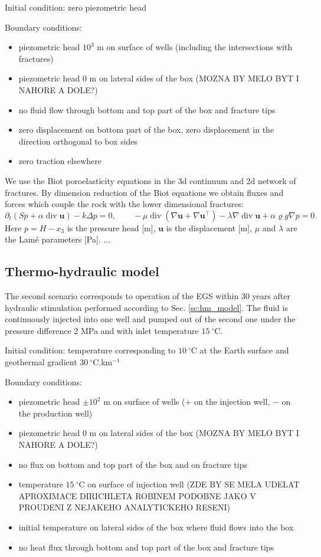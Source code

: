 \documentclass{article}
\renewcommand{\div}{\operatorname{div}}
\newcommand{\uu}{\vc u}
\newcommand{\vc}[1]{\boldsymbol{#1}}
\begin{document}
Initial condition: zero piezometric head

Boundary conditions:
\begin{itemize}
\item piezometric head $10^3$ m on surface of wells (including the intersections with fractures)
\item piezometric head 0 m on lateral sides of the box (MOZNA BY MELO BYT I NAHORE A DOLE?)
\item no fluid flow through bottom and top part of the box and fracture tips
\item zero displacement on bottom part of the box, zero displacement in the direction orthogonal to box sides
\item zero traction elsewhere
\end{itemize}

We use the Biot poroelasticity equations in the 3d continuum and 2d network of fractures. By dimension reduction of the Biot equations we obtain fluxes and forces which couple the rock with the lower dimensional fractures:
\[ \partial_t(Sp + \alpha\div\uu) - k\Delta p = 0,\qquad -\mu\div(\nabla\uu+\nabla\uu^\top) - \lambda\nabla\div\uu + \alpha\varrho g\nabla p = 0. \]
Here $p=H-x_3$ is the pressure head [m], $\uu$ is the displacement [m], $\mu$ and $\lambda$ are the Lamé parameters [Pa].
...


\subsection{Thermo-hydraulic model}

The second scenario corresponds to operation of the EGS within 30 years after hydraulic stimulation performed according to Sec. \ref{sc:hm_model}.
The fluid is continuously injected into one well and pumped out of the second one under the pressure difference 2 MPa and with inlet temperature $15\ ^\circ$C.

Initial condition:
temperature corresponding to $10\ ^\circ$C at the Earth surface and geothermal gradient $30\ ^\circ$C.km${}^{-1}$

Boundary conditions:
\begin{itemize}
\item piezometric head $\pm10^2$ m on surface of wells ($+$ on the injection well, $-$ on the production well)
\item piezometric head 0 m on lateral sides of the box (MOZNA BY MELO BYT I NAHORE A DOLE?)
\item no flux on bottom and top part of the box and on fracture tips
\item temperature $15\ ^\circ$C on surface of injection well (ZDE BY SE MELA UDELAT APROXIMACE DIRICHLETA ROBINEM PODOBNE JAKO V PROUDENI Z NEJAKEHO ANALYTICKEHO RESENI)
\item initial temperature on lateral sides of the box where fluid flows into the box
\item no heat flux through bottom and top part of the box and fracture tips
\end{itemize}
\end{document}
